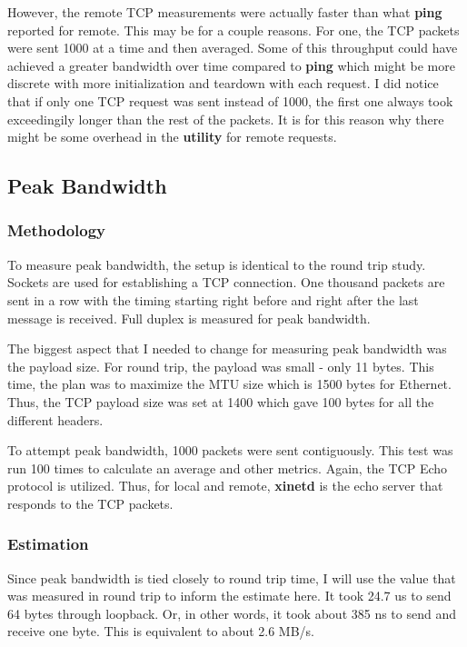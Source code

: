 \documentclass[paper=a4, fontsize=11pt]{scrartcl}
\numberwithin{equation}{section}        %
\numberwithin{figure}{section}          %
\numberwithin{table}{section}               %
\begin{document}
However, the remote TCP measurements were actually faster than what \textbf{ping} reported for remote.  This may be for a couple reasons.  For one, the TCP packets were sent 1000 at a time and then averaged.  Some of this throughput could have achieved a greater bandwidth over time compared to \textbf{ping} which might be more discrete with more initialization and teardown with each request.  I did notice that if only one TCP request was sent instead of 1000, the first one always took exceedingily longer than the rest of the packets.  It is for this reason why there might be some overhead in the \textbf{utility} for remote requests.

\subsection{Peak Bandwidth}

\subsubsection{Methodology}

To measure peak bandwidth, the setup is identical to the round trip study.  Sockets are used for establishing a TCP connection.  One thousand packets are sent in a row with the timing starting right before and right after the last message is received.  Full duplex is measured for peak bandwidth.

The biggest aspect that I needed to change for measuring peak bandwidth was the payload size.  For round trip, the payload was small - only 11 bytes.  This time, the plan was to maximize the MTU size which is 1500 bytes for Ethernet.  Thus, the TCP payload size was set at 1400 which gave 100 bytes for all the different headers.

To attempt peak bandwidth, 1000 packets were sent contiguously.  This test was run 100 times to calculate an average and other metrics.  Again, the TCP Echo protocol is utilized.  Thus, for local and remote, \textbf{xinetd} is the echo server that responds to the TCP packets.

\subsubsection{Estimation}

Since peak bandwidth is tied closely to round trip time, I will use the value that was measured in round trip to inform the estimate here.  It took 24.7 us to send 64 bytes through loopback.  Or, in other words, it took about 385 ns to send and receive one byte.  This is equivalent to about 2.6 MB/s.
\end{document}
